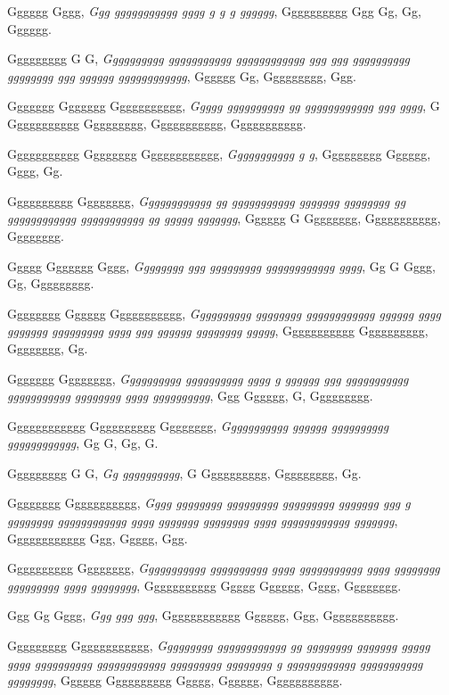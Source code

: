 \documentclass[conference]{IEEEtran}
\begin{document}
\begin{thebibliography}{9}

 Gggggg Gggg, \emph{Ggg ggggggggggg gggg g g g gggggg}, Gggggggggg Ggg Gg, Gg, Gggggg.

 Ggggggggg G G, \emph{Gggggggggg ggggggggggg gggggggggggg ggg ggg gggggggggg gggggggg ggg gggggg gggggggggggg}, Gggggg Gg, Ggggggggg, Ggg.

 Ggggggg Ggggggg Ggggggggggg, \emph{Ggggg gggggggggg gg gggggggggggg ggg gggg}, G Ggggggggggg Ggggggggg, Ggggggggggg, Ggggggggggg.

 Ggggggggggg Gggggggg Gggggggggggg, \emph{Ggggggggggg g g}, Ggggggggg Gggggg, Gggg, Gg.

 Gggggggggg Gggggggg, \emph{Gggggggggggg gg ggggggggggg ggggggg gggggggg gg gggggggggggg ggggggggggg gg ggggg ggggggg}, Gggggg G Gggggggg, Ggggggggggg, Gggggggg.

 Ggggg Ggggggg Gggg, \emph{Gggggggg ggg ggggggggg gggggggggggg gggg}, Gg G Gggg, Gg, Ggggggggg.

 Gggggggg Gggggg Ggggggggggg, \emph{Gggggggggg gggggggg gggggggggggg gggggg gggg ggggggg ggggggggg gggg ggg gggggg gggggggg ggggg}, Ggggggggggg Gggggggggg, Gggggggg, Gg.

 Ggggggg Gggggggg, \emph{Gggggggggg gggggggggg gggg g gggggg ggg ggggggggggg ggggggggggg gggggggg gggg gggggggggg}, Ggg Gggggg, G, Ggggggggg.

 Gggggggggggg Gggggggggg Gggggggg, \emph{Ggggggggggg gggggg gggggggggg gggggggggggg}, Gg G, Gg, G.

 Ggggggggg G G, \emph{Gg gggggggggg}, G Gggggggggg, Ggggggggg, Gg.

 Gggggggg Ggggggggggg, \emph{Gggg gggggggg ggggggggg ggggggggg ggggggg ggg g gggggggg gggggggggggg gggg ggggggg gggggggg gggg gggggggggggg ggggggg}, Gggggggggggg Ggg, Ggggg, Ggg.

 Gggggggggg Gggggggg, \emph{Ggggggggggg gggggggggg gggg ggggggggggg gggg gggggggg ggggggggg gggg gggggggg}, Ggggggggggg Ggggg Gggggg, Gggg, Gggggggg.

 Ggg Gg Gggg, \emph{Ggg ggg ggg}, Gggggggggggg Gggggg, Ggg, Ggggggggggg.

 Ggggggggg Gggggggggggg, \emph{Ggggggggg gggggggggggg gg gggggggg ggggggg ggggg gggg gggggggggg gggggggggggg ggggggggg gggggggg g gggggggggggg ggggggggggg gggggggg}, Gggggg Gggggggggg Ggggg, Gggggg, Ggggggggggg.


\end{thebibliography}
\end{document}
